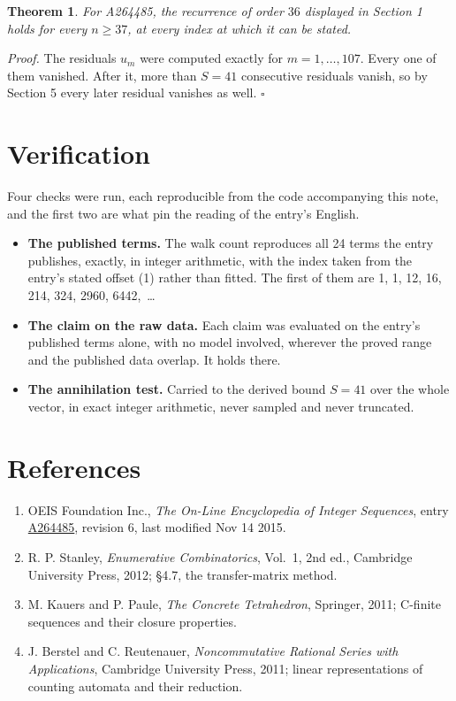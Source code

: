 \documentclass[11pt]{article}
\newtheorem{theorem}{Theorem}
\theoremstyle{definition}
\begin{document}
\begin{theorem} For A264485, the recurrence of order $36$ displayed in Section 1 holds for every $n \ge 37$, at every index at which it can be stated.\end{theorem}

{\itshape Proof.} The residuals $u_m$ were computed exactly for $m = 1,\dots,107$. Every one of them vanished. After it, more than $S = 41$ consecutive residuals vanish, so by Section 5 every later residual vanishes as well. $\square$

\section{Verification}

Four checks were run, each reproducible from the code accompanying this note, and the first two are what pin the reading of the entry's English.

\begin{itemize}

\item {\bfseries The published terms.} The walk count reproduces all 24 terms the entry publishes, exactly, in integer arithmetic, with the index taken from the entry's stated offset (1) rather than fitted. The first of them are 1, 1, 12, 16, 214, 324, 2960, 6442,~\dots

\item {\bfseries The claim on the raw data.} Each claim was evaluated on the entry's published terms alone, with no model involved, wherever the proved range and the published data overlap. It holds there.

\item {\bfseries The annihilation test.} Carried to the derived bound $S = 41$ over the whole vector, in exact integer arithmetic, never sampled and never truncated.

\end{itemize}

\section{References}

\begin{enumerate}

\item OEIS Foundation Inc., \emph{The On-Line Encyclopedia of Integer Sequences}, entry \href{https://oeis.org/A264485}{A264485}, revision 6, last modified Nov 14 2015.

\item R. P. Stanley, \emph{Enumerative Combinatorics}, Vol.~1, 2nd ed., Cambridge University Press, 2012; \S4.7, the transfer-matrix method.

\item M. Kauers and P. Paule, \emph{The Concrete Tetrahedron}, Springer, 2011; C-finite sequences and their closure properties.

\item J. Berstel and C. Reutenauer, \emph{Noncommutative Rational Series with Applications}, Cambridge University Press, 2011; linear representations of counting automata and their reduction.

\end{enumerate}
\end{document}
